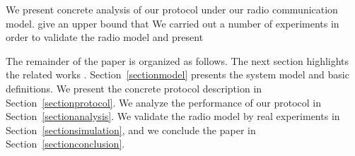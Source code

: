 We present concrete analysis of our protocol under our radio communication model.
give an upper bound that 
We carried out a number of experiments in order to validate the radio model and present

The remainder of the paper is organized as follows. The next section
highlights the related works .
Section~\ref{sectionmodel} presents
the system model and basic definitions.
We present the concrete protocol description
in Section~\ref{sectionprotocol}. We  
analyze the performance of our protocol in Section~\ref{sectionanalysis}. 
We validate the radio model by real experiments in Section~\ref{sectionsimulation}, 
and we conclude the paper in Section~\ref{sectionconclusion}.


 

